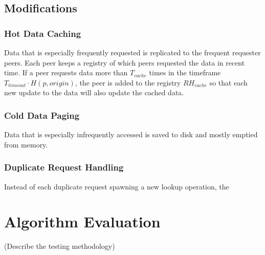 \documentclass[apa6]{IEEEtran}
\begin{document}
\subsection{Modifications}

\subsubsection{Hot Data Caching}
Data that is especially frequently requested is replicated to the frequent requester peers. Each peer keeps a registry of which peers requested the data in recent time. If a peer requests data more than $T_{cache}$ times in the timeframe $T_{timeout} \cdot H(p, origin)$, the peer is added to the registry $RH_{cache}$ so that each new update to the data will also update the cached data.

\subsubsection{Cold Data Paging}
Data that is especially infrequently accessed is saved to disk and mostly emptied from memory.

\subsubsection{Duplicate Request Handling}
Instead of each duplicate request spawning a new lookup operation,
the 


\section{Algorithm Evaluation}
\blindtext
\blindtext

\blindtext
\blindtext

\blindtext
(Describe the testing methodology) 
\end{document}
